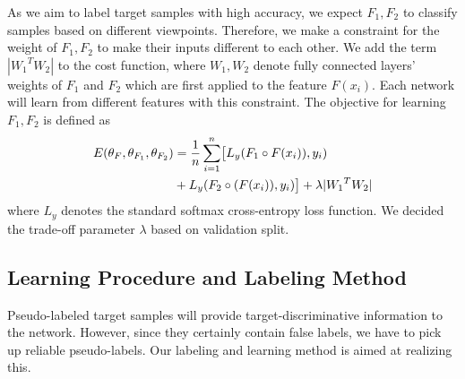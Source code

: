 \documentclass{article}
\begin{document}
As we aim to label target samples with high accuracy, we expect $F_1,F_2$ to classify samples based on different viewpoints.
Therefore, we make a constraint for the weight of $F_1,F_2$ to make their inputs different to each other.
We add the term $|{W_1}^{T}{W_2}|$ to the cost function, where ${W_1},{W_2}$ denote fully connected layers' weights of $F_1$ and $F_2$ which are first applied to the feature $F(x_{i})$. Each network will learn from different features with this constraint. The objective for learning $F_1,F_2$ is defined as
\begin{equation}
\begin{split}
E(\theta_F,\theta_{F_1},\theta_{F_2}) &= \frac{1}{n}\sum_{i=1}^{n}\bigl[L_{y}(F_{1}\circ F({x_{i}})),{y_{i}})\\
	&+L_{y}(F_{2}\circ (F({x_{i}})),{y_{i}})\bigr]+\lambda |{W_1}^{T}{W_2}|
\end{split}
\label{eq:sourcenet}
\vspace{-2mm}
\end{equation}
where $L_{y}$ denotes the standard softmax cross-entropy loss function. 
We decided the trade-off parameter $\lambda$ based on validation split.
\vspace{-2mm}
\subsection{Learning Procedure and Labeling Method}
Pseudo-labeled target samples will provide target-discriminative information to the network. However, since they certainly contain false labels, we have to pick up reliable pseudo-labels. Our labeling and learning method is aimed at realizing this.
\end{document}
